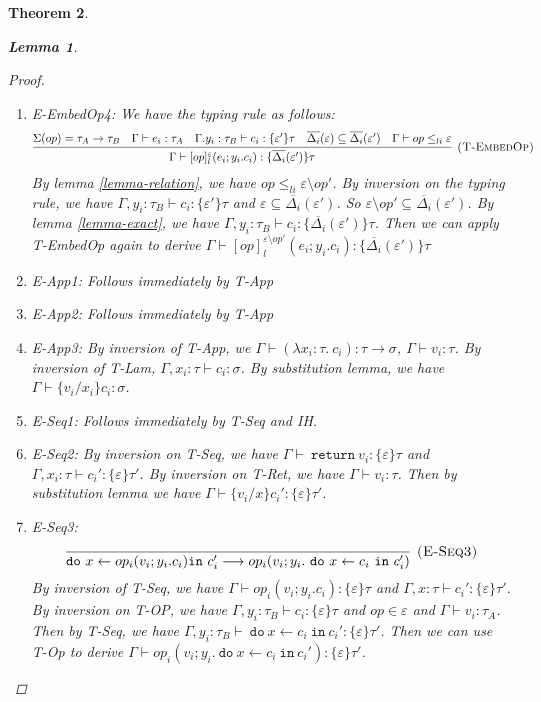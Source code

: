 \documentclass{article}
\newtheorem{theorem}{Theorem}[section]
\newtheorem{lemma}[theorem]{Lemma}
\newcommand{\m}[1]{\ \texttt{#1}\ }
\begin{document}
\begin{theorem}
\begin{lemma}
\begin{proof}
\begin{enumerate}
\item E-EmbedOp4:
We have the typing rule as follows:
$$\infer[\textsc{(T-EmbedOp)}]
  {\Gamma\vdash [op]^\varepsilon_l(e_i; y_i.c_i) : \{\overline{\Delta_i}(\varepsilon')\}\tau }
  {\Sigma(op) = \tau_A \rightarrow \tau_B & \Gamma \vdash e_i : \tau_A & \Gamma. y_i:\tau_B\vdash c_i: \{\varepsilon'\}\tau & \overline{\Delta_i}(\varepsilon) \subseteq \overline{\Delta_i}(\varepsilon') & \Gamma \vdash op \leq_{li} \varepsilon}  $$
By lemma \ref{lemma-relation}, we have $op \leq_{li} \varepsilon \setminus op'$. By inversion on the typing rule, we have $\Gamma, y_i:\tau_B \vdash c_i:\{\varepsilon'\}\tau$ and $\varepsilon \subseteq \overline{\Delta_i}(\varepsilon')$.  So $\varepsilon \setminus op' \subseteq \overline{\Delta_i}(\varepsilon')$. By lemma \ref{lemma-exact}, we have $\Gamma, y_i:\tau_B \vdash c_i:\{\overline{\Delta_i}(\varepsilon')\}\tau$. Then we can apply T-EmbedOp again to derive $\Gamma\vdash [op]^{\varepsilon \setminus op'}_l(e_i; y_i.c_i) : \{\overline{\Delta_i}(\varepsilon')\}\tau $
  
\item E-App1: Follows immediately by T-App
\item E-App2: Follows immediately by T-App
\item E-App3: By inversion of T-App, we $\Gamma \vdash (\lambda x_i: \tau.\ c_i) : \tau \rightarrow \sigma$, $\Gamma \vdash v_i : \tau$. By inversion of T-Lam, $\Gamma, x_i:\tau \vdash c_i : \sigma$. By substitution lemma, we have $\Gamma \vdash \{v_i/x_i\}c_i : \sigma$.

\item E-Seq1:  Follows immediately by T-Seq and IH.
\item E-Seq2: By inversion on T-Seq, we have $\Gamma \vdash \m{return} v_i : \{\varepsilon\}\tau$ and $\Gamma, x_i:  \tau \vdash c_i': \{\varepsilon\}\tau'$. By inversion on T-Ret, we have $\Gamma \vdash v_i: \tau$. Then by substitution lemma we have $\Gamma \vdash \{v_i/x\}c_i' : \{\varepsilon\}\tau'$.
\item E-Seq3: 
$$
\infer[\textsc{(E-Seq3)}]
  {\texttt{do}\ x \leftarrow op_i(v_i; y_i.c_i) \texttt{in}\ c_i' \longrightarrow op_i(v_i; y_i. \m{do} x \leftarrow c_i \m{in} c_i')}
  {} $$
  By inversion of T-Seq, we have $\Gamma \vdash op_i(v_i; y_i.c_i) : \{\varepsilon\}\tau$  and $\Gamma , x:\tau \vdash c_i' : \{\varepsilon\}\tau'$. By inversion on T-OP, we have $\Gamma, y_i: \tau_B \vdash c_i: \{\varepsilon\}\tau$ and $op \in \varepsilon$ and $\Gamma \vdash v_i : \tau_A$.  Then by T-Seq, we have $\Gamma, y_i : \tau_B \vdash \m{do} x \leftarrow c_i \m{in} c_i' : \{\varepsilon\}\tau'$. Then we can use T-Op to derive $\Gamma \vdash op_i(v_i; y_i. \m{do} x \leftarrow c_i \m{in} c_i') : \{\varepsilon\}\tau'$.


\end{enumerate}
\end{proof}
\end{lemma}
\end{theorem}
\end{document}
